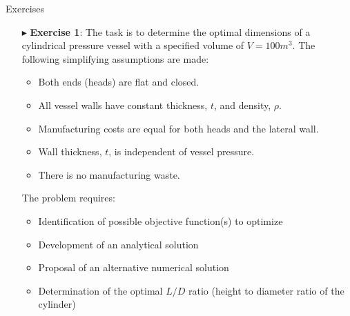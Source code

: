 \documentclass[xcolor={dvipsnames,rgb}, aspectratio=169]{beamer}
\begin{document}
{%
   \begin{frame}[standout]
	   Exercises
   \end{frame}
}

\begin{frame}
   \begin{itemize}
      \item[$\blacktriangleright$] \textbf{Exercise 1}: The task is to determine the
         optimal dimensions of a cylindrical pressure vessel with a specified volume of
         $V = 100 m^3$. The following simplifying assumptions are made:
         \begin{itemize}
            \item Both ends (heads) are flat and closed.
            \item All vessel walls have constant thickness, $t$, and density, $\rho$.
            \item Manufacturing costs are equal for both heads and the lateral wall.
            \item Wall thickness, $t$, is independent of vessel pressure.
            \item There is no manufacturing waste.
         \end{itemize}
         The problem requires:
         \begin{itemize}
            \item Identification of possible objective function(s) to optimize
            \item Development of an analytical solution
            \item Proposal of an alternative numerical solution
            \item Determination of the optimal $L/D$ ratio (height to diameter ratio of the cylinder)
         \end{itemize}

   \end{itemize}
\end{frame}
\end{document}
